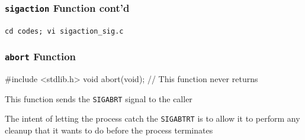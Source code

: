\documentclass[newPxFont,sthlmFooter,nooffset]{beamer}
\begin{document}
\begin{frame}[fragile,t]
  \frametitle{\texttt{sigaction} Function cont'd}
\texttt{cd codes; vi sigaction\_sig.c}


\end{frame}

\begin{frame}[containsverbatim,t]
  \frametitle{\texttt{abort} Function}
\begin{codedef}
#include <stdlib.h>
void abort(void);
// This function never returns
\end{codedef}

This function sends the \texttt{SIGABRT} signal to the caller

The intent of letting the process catch the \texttt{SIGABTRT} is to allow it to perform any cleanup that it wants to do before the process terminates

\end{frame}
\end{document}
